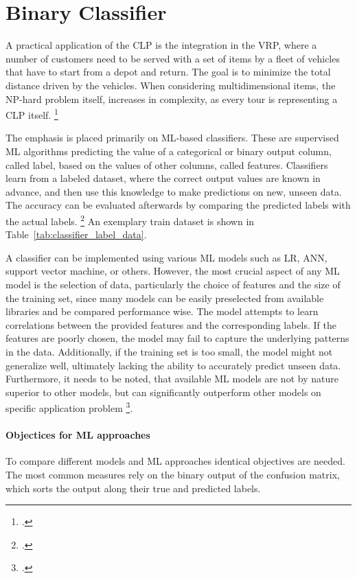 \chapter{Binary Classifier}
\label{chap:classifier}

A practical application of the \gls{CLP} is the integration in the \gls{VRP}, where
a number of customers need to be served with a set of items by a fleet of vehicles that have
to start from a depot and return. The goal is to minimize the total distance driven
by the vehicles. When considering multidimensional items, the NP-hard problem itself,
increases in complexity, as every tour is representing a \gls{CLP} itself. \footcite[cf.][pp. 1--2]{tamke_branch-and-cut_2024}

The emphasis is placed primarily on \gls{ML}-based classifiers.
These are supervised \gls{ML} algorithms predicting the
value of a categorical or binary output column, called label, based on the
values of other columns, called features. Classifiers learn from a labeled dataset,
where the correct output values are known in advance, and then use this knowledge to
make predictions on new, unseen data. The accuracy can be evaluated afterwards by comparing
the predicted labels with the actual labels. \footcite[cf.][]{kotsiantis_supervised_2007}
An exemplary train dataset is shown in Table~\ref{tab:classifier_label_data}.



A classifier can be implemented using various \gls{ML} models such as \gls{LR},
\gls{ANN}, support vector machine, or others. However, the most crucial aspect of any
\gls{ML} model is the selection of data, particularly the choice of features and
the size of the training set, since many models can be easily preselected from available
libraries and be compared performance wise. The model attempts to learn correlations between the provided features
and the corresponding labels. If the features are poorly chosen, the model may fail
to capture the underlying patterns in the data. Additionally, if the training set
is too small, the model might not generalize well, ultimately lacking the ability
to accurately predict unseen data. Furthermore, it needs to be noted, that available
\gls{ML} models are not by nature superior to other models, but can significantly outperform
other models on specific application problem \footcite[cf.][pp. 250, 264]{kotsiantis_supervised_2007}.


\subsubsection{Objectices for ML approaches}
To compare different models and \gls{ML} approaches identical objectives are needed. The most common
measures rely on the binary output of the confusion matrix, which sorts the output along
their true and predicted labels.

